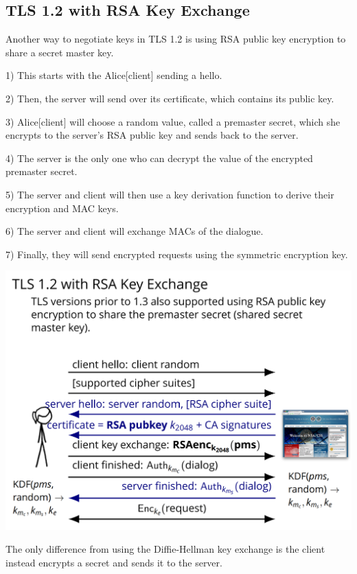 \documentclass[11pt]{article} %
\begin{document}
{\subsection{TLS 1.2 with RSA Key Exchange}
Another way to negotiate keys in TLS 1.2 is using RSA public key encryption to 
share a secret master key.

\bigskip
{\parindent0pt 1) This starts with the Alice[client] sending a hello.}

\smallskip
{\parindent0pt 2) Then, the server will send over its certificate, which 
contains its public key.}

\smallskip
{\parindent0pt 3) Alice[client] will choose a random value, called a premaster 
secret, which she encrypts to the server's RSA public key and sends back to the 
server.}

\smallskip
{\parindent0pt 4) The server is the only one who can decrypt the value of the 
encrypted premaster secret.}

\smallskip
{\parindent0pt 5) The server and client will then use a key derivation function 
to derive their encryption and MAC keys.}

\smallskip
{\parindent0pt 6) The server and client will exchange MACs of the dialogue.}

\smallskip
{\parindent0pt 7) Finally, they will send encrypted requests using the symmetric 
encryption key.}

\includegraphics[scale=.6]{./TLS_RSA.png}

The only difference from using the Diffie-Hellman key exchange is the client 
instead encrypts a secret and sends it to the server.

}
\end{document}
